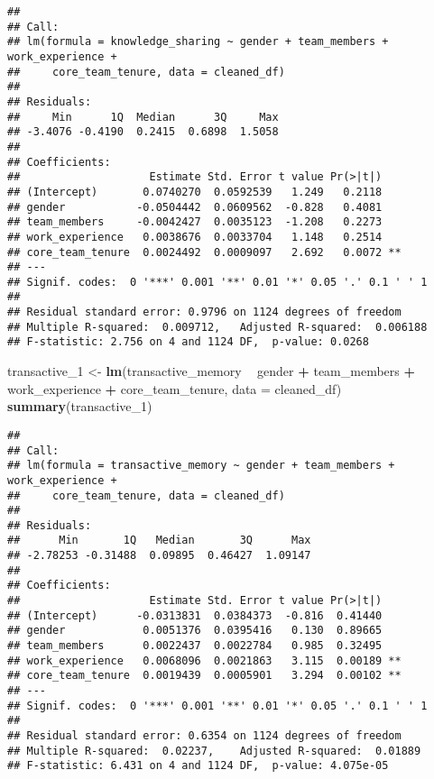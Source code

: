 \documentclass[]{article}
\newenvironment{Shaded}{\begin{snugshade}}{\end{snugshade}}
\newcommand{\DataTypeTok}[1]{\textcolor[rgb]{0.13,0.29,0.53}{#1}}
\newcommand{\DecValTok}[1]{\textcolor[rgb]{0.00,0.00,0.81}{#1}}
\newcommand{\KeywordTok}[1]{\textcolor[rgb]{0.13,0.29,0.53}{\textbf{#1}}}
\newcommand{\NormalTok}[1]{#1}
\newcommand{\OperatorTok}[1]{\textcolor[rgb]{0.81,0.36,0.00}{\textbf{#1}}}
\newcommand{\StringTok}[1]{\textcolor[rgb]{0.31,0.60,0.02}{#1}}
\begin{document}
\begin{verbatim}
## 
## Call:
## lm(formula = knowledge_sharing ~ gender + team_members + work_experience + 
##     core_team_tenure, data = cleaned_df)
## 
## Residuals:
##     Min      1Q  Median      3Q     Max 
## -3.4076 -0.4190  0.2415  0.6898  1.5058 
## 
## Coefficients:
##                    Estimate Std. Error t value Pr(>|t|)   
## (Intercept)       0.0740270  0.0592539   1.249   0.2118   
## gender           -0.0504442  0.0609562  -0.828   0.4081   
## team_members     -0.0042427  0.0035123  -1.208   0.2273   
## work_experience   0.0038676  0.0033704   1.148   0.2514   
## core_team_tenure  0.0024492  0.0009097   2.692   0.0072 **
## ---
## Signif. codes:  0 '***' 0.001 '**' 0.01 '*' 0.05 '.' 0.1 ' ' 1
## 
## Residual standard error: 0.9796 on 1124 degrees of freedom
## Multiple R-squared:  0.009712,   Adjusted R-squared:  0.006188 
## F-statistic: 2.756 on 4 and 1124 DF,  p-value: 0.0268
\end{verbatim}

\begin{Shaded}
\begin{Highlighting}[]
\NormalTok{transactive_}\DecValTok{1}\NormalTok{ <-}\StringTok{ }\KeywordTok{lm}\NormalTok{(transactive_memory }\OperatorTok{~}\StringTok{ }\NormalTok{gender }\OperatorTok{+}\StringTok{ }\NormalTok{team_members }\OperatorTok{+}\StringTok{ }\NormalTok{work_experience }\OperatorTok{+}\StringTok{ }\NormalTok{core_team_tenure, }\DataTypeTok{data =}\NormalTok{ cleaned_df)}
\KeywordTok{summary}\NormalTok{(transactive_}\DecValTok{1}\NormalTok{)}
\end{Highlighting}
\end{Shaded}

\begin{verbatim}
## 
## Call:
## lm(formula = transactive_memory ~ gender + team_members + work_experience + 
##     core_team_tenure, data = cleaned_df)
## 
## Residuals:
##      Min       1Q   Median       3Q      Max 
## -2.78253 -0.31488  0.09895  0.46427  1.09147 
## 
## Coefficients:
##                    Estimate Std. Error t value Pr(>|t|)   
## (Intercept)      -0.0313831  0.0384373  -0.816  0.41440   
## gender            0.0051376  0.0395416   0.130  0.89665   
## team_members      0.0022437  0.0022784   0.985  0.32495   
## work_experience   0.0068096  0.0021863   3.115  0.00189 **
## core_team_tenure  0.0019439  0.0005901   3.294  0.00102 **
## ---
## Signif. codes:  0 '***' 0.001 '**' 0.01 '*' 0.05 '.' 0.1 ' ' 1
## 
## Residual standard error: 0.6354 on 1124 degrees of freedom
## Multiple R-squared:  0.02237,    Adjusted R-squared:  0.01889 
## F-statistic: 6.431 on 4 and 1124 DF,  p-value: 4.075e-05
\end{verbatim}
\end{document}
